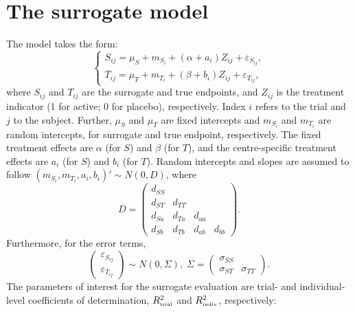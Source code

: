 \documentclass[11pt,a5paper,twoside]{book}
\begin{document}
{\section{The surrogate model}
\label{sec_surrogate_model}
The model takes the form:
\begin{equation}
\label{surrogatemodel}
\left\{
\begin{array}{l}
S_{ij}=\mu_S + m_{S_i} + (\alpha + a_i) Z_{ij} + \varepsilon_{S_{ij}},\\
T_{ij}= \mu_T + m_{T_i} + (\beta + b_i) Z_{ij} + \varepsilon_{T_{ij}},
\end{array} \right.
\end{equation}
where $S_{ij}$ and $T_{ij}$ are the surrogate and true endpoints, and $Z_{ij}$ is the treatment indicator (1 for active; 0 for placebo), respectively. Index $i$ refers to the trial and $j$ to the subject. Further, $\mu_{S}$ and $\mu_{T}$ are fixed intercepts and $m_{S_i}$ and $m_{T_i}$ are  random intercepts, for surrogate and true endpoint, respectively. The fixed treatment effects are $\alpha$ (for $S$) and $\beta$ (for $T$), and the centre-specific treatment effects are $a_i$ (for $S$) and $b_i$ (for $T$). 
Random intercepts and slopes are assumed to follow
$(m_{S_i}, m_{T_i}, a_i, b_i)'\sim N(0,D)$,
where 
\begin{equation}
\label{D}
D = \left(
\begin{array}{cccc}
d_{SS} & & &\\
d_{ST} & d_{TT} & &\\
d_{Sa} & d_{Ta} & d_{aa} &\\
d_{Sb} & d_{Tb} & d_{ab} & d_{bb}
\end{array} \right).
\end{equation}
Furthermore, for the error terms,
\begin{equation}
\label{surrogateSigma}
\left(\begin{array}{c}
\varepsilon_{S_{ij}}\\
\varepsilon_{T_{ij}}
\end{array} \right)
\sim N(0,\Sigma),\; \Sigma = \left(
\begin{array}{cc}
\sigma_{SS} & \\
\sigma_{ST} & \sigma_{TT}
\end{array} \right).
\end{equation}
The parameters of interest for the surrogate evaluation are trial- and individual-level coefficients of determination, $R^2_{\mbox{\tiny trial}}$ and $R^2_{\mbox{\tiny indiv}}$, respectively:
\begin{equation}

\end{equation}}
\end{document}
